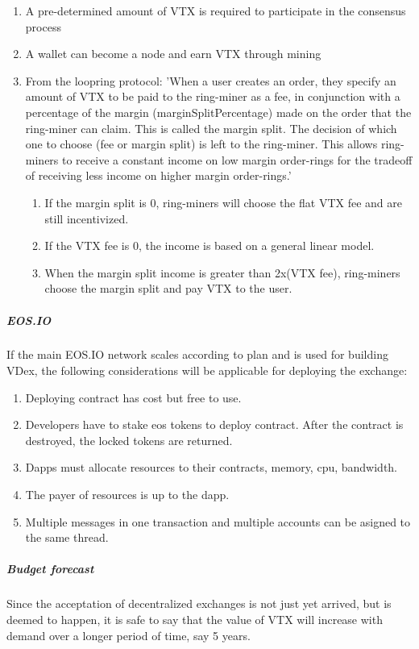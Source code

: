 \documentclass[]{article}
\begin{document}
\begin{enumerate}
\item A pre-determined amount of VTX is required to participate in the consensus process
\item A wallet can become a node and earn VTX through mining
\item From the loopring protocol:
'When a user creates an order, they specify an amount of VTX to be paid to the ring-miner as a fee, in conjunction with a percentage of the margin (marginSplitPercentage) made on the order that the ring-miner can claim. This is
called the margin split. The decision of which one to choose
(fee or margin split) is left to the ring-miner.
This allows ring-miners to receive a constant income on 
low margin order-rings for the tradeoff of receiving less 
income on higher margin order-rings.'
\begin{enumerate}
	\item If the margin split is 0, ring-miners will choose the flat VTX fee and are still incentivized.
	
	\item If the VTX fee is 0, the income is based on a general linear model.
	
	\item When the margin split income is greater than 2x(VTX fee), ring-miners choose the margin split and pay VTX to the user. 
\end{enumerate}	
\end{enumerate}


\subparagraph{EOS.IO}
If the main EOS.IO network scales according to plan and is used for building VDex, the following considerations will be applicable for deploying the exchange:
\begin{enumerate}
\item Deploying contract has cost but free to use. 
\item Developers have to stake eos tokens to deploy contract.
After the contract is destroyed, the locked tokens are returned.
\item Dapps must allocate resources to their contracts, memory, cpu, bandwidth. 
\item The payer of resources is up to the dapp.
\item Multiple messages in one transaction and multiple accounts can be asigned to the same thread.

\end{enumerate}

\subparagraph{Budget forecast}
Since the acceptation of decentralized exchanges is not just yet arrived,
but is deemed to happen, it is safe to say that the value of VTX will increase with demand over a longer period of time, say 5 years.
\end{document}
